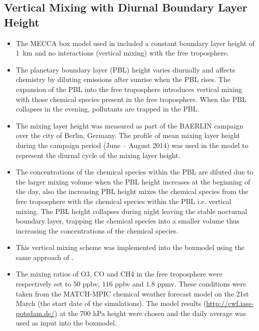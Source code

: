 \subsection{Vertical Mixing with Diurnal Boundary Layer Height} \label{ss:vertical_mixing}
\begin{itemize}
    \item The MECCA box model used in \citet{Coates:2015} included a constant boundary layer height of $1$~km and no interactions (vertical mixing) with the free troposphere.
    \item The planetary boundary layer (PBL) height varies diurnally and affects chemistry by diluting emissions after sunrise when the PBL rises. The expansion of the PBL into the free troposphere introduces vertical mixing with those chemical species present in the free troposphere. When the PBL collapses in the evening, pollutants are trapped in the PBL.
    \item The mixing layer height was measured as part of the BAERLIN campaign  over the city of Berlin, Germany. The profile of mean mixing layer height during the campaign period (June -- August 2014) was used in the model to represent the diurnal cycle of the mixing layer height.
    \item The concentrations of the chemical species within the PBL are diluted due to the larger mixing volume when the PBL height increases at the beginning of the day, also the increasing PBL height mixes the chemical species from the free troposphere with the chemical species within the PBL i.e. vertical mixing. The PBL height collapses during night leaving the stable nocturnal boundary layer, trapping the chemical species into a smaller volume thus increasing the concentrations of the chemical species.
    \item This vertical mixing scheme was implemented into the boxmodel using the same approach of \citet{Lourens:2012}.
    \item The mixing ratios of O3, CO and CH4 in the free troposphere were respectively set to $50$ ppbv, $116$ ppbv and $1.8$ ppmv. These conditions were taken from the MATCH-MPIC chemical weather forecast model on the 21st March (the start date of the simulations). The model results (\url{http://cwf.iass-potsdam.de/}) at the 700 hPa height were chosen and the daily average was used as input into the boxmodel. 
\end{itemize}
